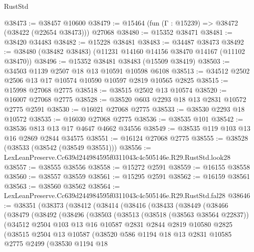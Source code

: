\begin{lexlean}{RustStd}
\begin{coremodule}
@38473 := @38457 @10600
@38479 := @15464 (fun (Γ : @15239) => @38472 (@38422 (@22654 @38473))) @27068
@38480 := @15352 @38471
@38481 := @38420 @34483
@38482 := @15228 @38481
@38483 := @34487 @38473
@38492 := @38480 (@38482 @38483) (@11231 @14160 @14156 @38470 @14167 (@11102 @38470))
@38496 := @15352 @38481 @38483 (@15509 @38419)
@38503 := @34503 @1139 @2507 @18 @13 @10591 @10598 @6108
@38513 := @34512 @2502 @2506 @13 @17 @10574 @10590 @10597 @2819 @10565 @2825
@38515 := @15998 @27068 @2775
@38518 := @38515 @2502 @13 @10574
@38520 := @16007 @27068 @2775
@38528 := @38520 @603 @2293 @18 @13 @2831 @10572 @2775 @2591
@38530 := @16021 @27068 @2775
@38533 := @38530 @2293 @18 @10572
@38535 := @16030 @27068 @2775
@38536 := @38535 @101
@38542 := @38536 @813 @13 @17 @4647 @4662 @34556
@38549 := @38535 @119 @103 @13 @16 @2869 @2844 @34575
@38551 := @16124 @27068 @2775
@38555 := @38528 (@38533 (@38542 (@38549 @38551)))
@38556 := LexLeanPreserve.Cc639d244984595f0311043c4c505146e.R29.RustStd.look28
@38557 := @38555 @38556
@38558 := @15272 @2591
@38559 := @16155 @38558
@38560 := @38557 @38559
@38561 := @15295 @2591
@38562 := @16159 @38561
@38563 := @38560 @38562
@38564 := LexLeanPreserve.Cc639d244984595f0311043c4c505146e.R29.RustStd.fal28
@38646 := @38351
    (@38373
      (@38412
        (@38414
          (@38416
            (@38433
              (@38449
                (@38466
                  (@38479
                    (@38492
                      (@38496
                        (@38503
                          (@38513
                            (@38518 (@38563 @38564 @22837))
                            (@34512
                              @2504
                              @103
                              @13
                              @16
                              @10587
                              @2831
                              @2844
                              @2819
                              @10580
                              @2825
                              (@38515
                                @2504
                                @13
                                @10587
                                (@38520
                                  @586
                                  @1194
                                  @18
                                  @13
                                  @2831
                                  @10585
                                  @2775
                                  @2499
                                  (@38530
                                    @1194
                                    @18

\end{coremodule}
\end{lexlean}
